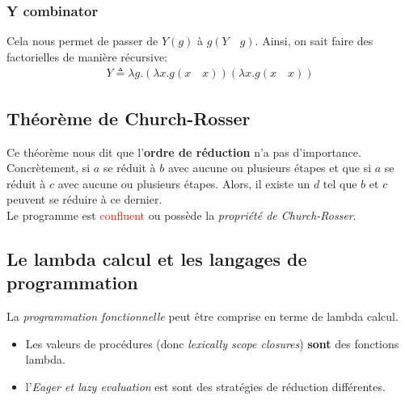 \documentclass{report}
\begin{document}
\subsubsection{Y combinator}
Cela nous permet de passer de $Y(g)$ à $g(Y \quad g)$. Ainsi, on sait faire des factorielles de manière récursive:
\begin{align*}
Y \triangleq \lambda g.(\lambda x.g (x \quad x)) (\lambda x.g(x \quad x))
\end{align*}

\subsection{Théorème de Church-Rosser}
Ce théorème nous dit que l'\textbf{ordre de réduction} n'a pas d'importance.\\
Concrètement, si $a$ se réduit à $b$ avec aucune ou plusieurs étapes et que si $a$ se réduit à $c$ avec aucune ou plusieurs étapes. Alors, il existe un $d$ tel que $b$ et $c$ peuvent se réduire à ce dernier.\\
Le programme est \textcolor{red}{confluent} ou possède la \textit{propriété de Church-Rosser}.

\subsection{Le lambda calcul et les langages de programmation}
La \textit{programmation fonctionnelle} peut être comprise en terme de lambda calcul.
\begin{itemize}
\item Les valeurs de procédures (donc \textit{lexically scope closures}) \textbf{sont} des fonctions lambda.
\item l'\textit{Eager et lazy evaluation} est sont des stratégies de réduction différentes.
\end{itemize}
\end{document}
